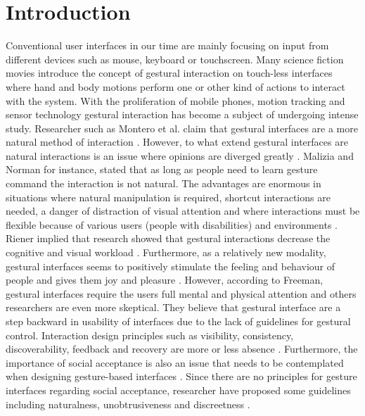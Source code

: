 \chapter{Introduction}
\label{chap:introduction}


Conventional user interfaces in our time are mainly focusing on input from different devices such as mouse, keyboard or touchscreen. Many science fiction movies introduce the concept of gestural interaction on touch-less interfaces where hand and body motions perform one or other kind of actions to interact with the system. With the proliferation of mobile phones, motion tracking and sensor technology gestural interaction has become a subject of undergoing intense study. Researcher such as Montero et al. claim that gestural interfaces are a more natural method of interaction \cite{Montero2010}. However, to what extend gestural interfaces are natural interactions is an issue where opinions are diverged greatly \cite{Norman2010}. Malizia and Norman \cite{Malizia2012, Norman2010} for instance, stated that as long as people need to learn gesture command the interaction is not natural. The advantages are enormous in situations where natural manipulation is required, shortcut interactions are needed, a danger of distraction of visual attention and where interactions must be flexible because of various users (people with disabilities) and environments \cite{ParkWonkyu2014}. Riener implied that research showed that gestural interactions decrease the cognitive and visual workload \cite{Riener2012}. Furthermore, as a relatively new modality, gestural interfaces seems to positively stimulate the feeling and behaviour of people and gives them joy and pleasure \cite{Loehmann2013, RenGang2013}. However, according to Freeman, gestural interfaces require the users full mental and physical attention \cite{Freeman2012} and others researchers are even more skeptical. They believe that gestural interface are a step backward in usability of interfaces due to the lack of guidelines for gestural control. Interaction design principles such as visibility, consistency, discoverability, feedback and recovery are more or less absence \cite{NormanNielsen2010}. Furthermore, the importance of social acceptance is also an issue that needs to be contemplated when designing gesture-based interfaces \cite{Montero2010}. Since there are no principles for gesture interfaces regarding social acceptance, researcher have proposed some guidelines including naturalness, unobtrusiveness and discreetness \cite{Montero2010}. 
\newline
